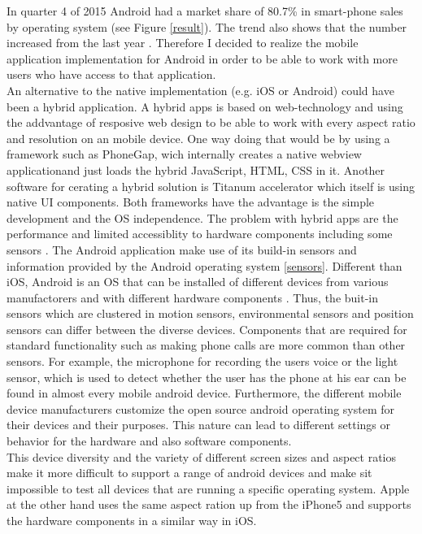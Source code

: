 \begin{flushleft}
In quarter 4 of 2015 Android had a market share of 80.7\% in smart-phone sales by operating system (see Figure \ref{result}). The trend also shows that the number increased from the last year \cite{gartnerMobileOSMarketshare}. Therefore I decided to realize the mobile application implementation for Android in order to be able to work with more users who have access to that application.\\
An alternative to the native implementation (e.g. iOS or Android) could have been a hybrid application. A hybrid apps is based on web-technology and using the addvantage of resposive web design to be able to work with every aspect ratio and resolution on an mobile device. One way doing that would be by using a framework such as PhoneGap, wich internally creates a native webview applicationand just loads the hybrid JavaScript, HTML, CSS in it. Another software for cerating a hybrid solution is Titanum accelerator which itself is using native UI components. Both frameworks have the advantage is the simple development and the OS independence. The problem with hybrid apps are the performance and limited accessiblity to hardware components including some sensors \cite{holzinger2012making}.  
\bigbreak
The Android application make use of its build-in sensors and information provided by the Android operating system \ref{sensors}. Different than iOS, Android is an OS that can be installed of different devices from various manufactorers and with different hardware components \cite{goadrich2011smart}. Thus, the buit-in sensors which are clustered in motion sensors, environmental sensors and position sensors \cite{androidDevelopers} can differ between the diverse devices. Components that are required for standard functionality such as making phone calls are more common than other sensors. For example, the microphone for recording the users voice or the light sensor, which is used to detect whether the user has the phone at his ear can be found in almost every mobile android device. 
Furthermore, the different mobile device manufacturers customize the open source android operating system for their devices and their purposes. This nature can lead to different settings or behavior for the hardware and also software components.\\
This device diversity and the variety of different screen sizes and aspect ratios make it more difficult to support a range of android devices and make sit impossible to test all devices that are running a specific operating system. Apple at the other hand uses the same aspect ration up from the iPhone5 and supports the hardware components in a similar way in iOS. 
\end{flushleft}

